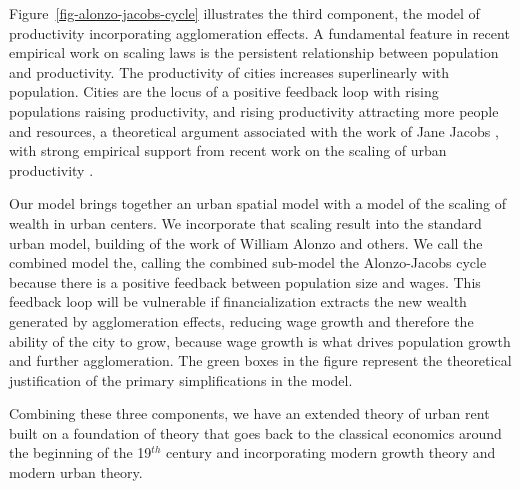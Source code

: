Figure~\ref{fig-alonzo-jacobs-cycle} illustrates the third component, the model of productivity incorporating agglomeration effects. A fundamental feature in recent empirical work on scaling laws is the persistent relationship between population and productivity. The productivity of cities increases superlinearly with population. Cities are the locus of a positive feedback loop with rising populations raising productivity, and rising productivity attracting more people and resources, a theoretical argument associated with the work of Jane Jacobs \cite{jacobsEconomyCities1969}, with strong empirical support from recent work on the scaling of urban productivity  \cite{bettencourtGrowthInnovationScaling2007, bettencourtOriginsScalingCities2013, dongUnderstandingMesoscopicScaling2020, loboUrbanScalingProduction2013}.

Our model brings together an urban spatial model with a model of the scaling of wealth in urban centers. %
We incorporate that scaling result into the standard urban model, building of the work of William Alonzo and others. %
We call the combined model the\cite{alonzoTheoryUrbanLand1960}, calling the combined sub-model the 
\gls{Alonzo-Jacobs cycle} because there is a positive feedback between population size and wages. This feedback loop will be vulnerable if financialization extracts the new wealth generated by agglomeration effects, reducing wage growth and therefore the ability of the city to grow, because wage growth is what drives population growth and further agglomeration.
The green boxes in the figure represent the theoretical justification of the primary simplifications in the model. 

Combining these three components, we have an extended theory of urban rent built on a foundation of theory that goes back to the \gls{classical economics} around the beginning of the 19$^{th}$ century and incorporating modern growth theory and modern urban theory. 

